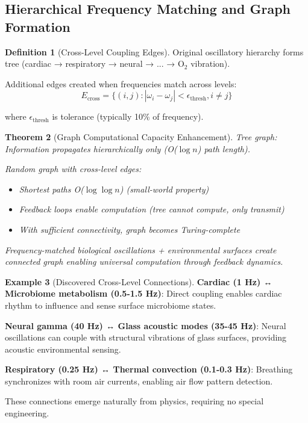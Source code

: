 \documentclass[11pt,a4paper]{article}
\newtheorem{theorem}{Theorem}[section]
\theoremstyle{definition}
\newtheorem{definition}[theorem]{Definition}
\newtheorem{example}[theorem]{Example}
\theoremstyle{remark}
\begin{document}
\subsection{Hierarchical Frequency Matching and Graph Formation}

\begin{definition}[Cross-Level Coupling Edges]
Original oscillatory hierarchy forms tree (cardiac → respiratory → neural → ... → O$_2$ vibration). 

Additional edges created when frequencies match across levels:
\begin{equation}
E_{\text{cross}} = \{(i,j) : |\omega_i - \omega_j| < \epsilon_{\text{thresh}}, i \neq j\}
\end{equation}

where $\epsilon_{\text{thresh}}$ is tolerance (typically 10\% of frequency).
\end{definition}

\begin{theorem}[Graph Computational Capacity Enhancement]
Tree graph: Information propagates hierarchically only (O($\log n$) path length).

Random graph with cross-level edges: 
\begin{itemize}
\item Shortest paths O($\log \log n$) (small-world property)
\item Feedback loops enable computation (tree cannot compute, only transmit)
\item With sufficient connectivity, graph becomes Turing-complete
\end{itemize}

Frequency-matched biological oscillations + environmental surfaces create connected graph enabling universal computation through feedback dynamics.
\end{theorem}

\begin{example}[Discovered Cross-Level Connections]
\textbf{Cardiac (1 Hz) ↔ Microbiome metabolism (0.5-1.5 Hz)}: Direct coupling enables cardiac rhythm to influence and sense surface microbiome states.

\textbf{Neural gamma (40 Hz) ↔ Glass acoustic modes (35-45 Hz)}: Neural oscillations can couple with structural vibrations of glass surfaces, providing acoustic environmental sensing.

\textbf{Respiratory (0.25 Hz) ↔ Thermal convection (0.1-0.3 Hz)}: Breathing synchronizes with room air currents, enabling air flow pattern detection.

These connections emerge naturally from physics, requiring no special engineering.
\end{example}
\end{document}
